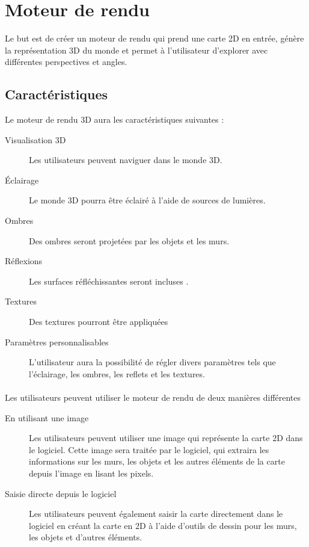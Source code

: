 \documentclass{article}
\begin{document}
\section{Moteur de rendu}
Le but est de créer un moteur de rendu qui prend une carte 2D en entrée, génère la représentation 3D du monde et permet à l'utilisateur  d'explorer avec différentes perspectives et angles.

\subsection{Caractéristiques}
Le moteur de rendu 3D aura les caractéristiques suivantes :

\begin{description}
    \item[Visualisation 3D]  Les utilisateurs peuvent naviguer dans le monde 3D.
    \item[Éclairage] Le monde 3D pourra être éclairé à l'aide de sources de lumières.
    \item[Ombres] Des ombres seront projetées par les objets et les murs.
    \item[Réflexions] Les surfaces réfléchissantes seront incluses .
    \item[Textures] Des textures pourront être appliquées
    \item[Paramètres personnalisables] L'utilisateur aura la possibilité de régler divers paramètres tels que l'éclairage, les ombres, les reflets et les textures.
\end{description}

\paragraph{}

Les utilisateurs peuvent utiliser le moteur de rendu de deux manières différentes

\begin{description}
    \item[En utilisant une image] Les utilisateurs peuvent utiliser une image qui représente la carte 2D dans le logiciel. Cette image sera traitée par le logiciel, qui extraira les informations sur les murs, les objets et les autres éléments de la carte depuis l'image en lisant les pixels. 
    \item[Saisie directe depuis le logiciel] Les utilisateurs peuvent également saisir la carte directement dans le logiciel en créant la carte en 2D à l'aide d'outils de dessin pour les murs, les objets et d'autres éléments. 
\end{description}
\end{document}
